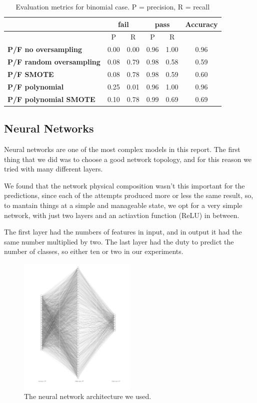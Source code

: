 \documentclass{article}
\begin{document}
\begin{table}[h!]
  \centering
  \begin{tabular}{|p{3cm}|c|c|c|c|c|}
    \hline
      & \multicolumn{2}{|c|}{\textbf{fail}} & \multicolumn{2}{|c|}{\textbf{pass}} & \textbf{Accuracy} \\
    \hline
    & P & R & P & R &  \\
    \hline
    \textbf{P/F no oversampling} & 0.00 & 0.00 & 0.96 & 1.00 & 0.96 \\
    \hline
    \textbf{P/F random oversampling} & 0.08 & 0.79 & 0.98 & 0.58 & 0.59 \\
    \hline
    \textbf{P/F SMOTE} & 0.08 & 0.78 & 0.98 & 0.59 & 0.60 \\
    \hline
    \textbf{P/F polynomial} & 0.25 & 0.01 & 0.96 & 1.00 & 0.96 \\
    \hline
    \textbf{P/F polynomial SMOTE} & 0.10 & 0.78 & 0.99 & 0.69 & 0.69 \\
    \hline
  \end{tabular}
  \caption{Evaluation metrics for binomial case. P = precision, R = recall}
  \label{tab:EvMetBinreg}
\end{table}

\FloatBarrier
\subsection{Neural Networks}
\FloatBarrier

Neural networks are one of the most complex models in this report.
The first thing that we did was to choose a good network topology, and for this reason we tried with many different layers.

We found that the network physical composition wasn't this important for the predictions, since each of the attempts produced more or less the same 
result, so, to mantain things at a simple and manageable state, we opt for a very simple network, with just two layers and an actiavtion function 
(ReLU) in between.

The first layer had the numbers of features in input, and in output it had the same number multiplied by two. The last layer had the duty
to predict the number of classes, so either ten or two in our experiments.

\begin{figure}[h!]
    \centering
    \includegraphics[width=0.5\textwidth]{nn_architecture.png}
    \caption{\label{fig:nn}The neural network architecture we used.}
\end{figure}
\end{document}
